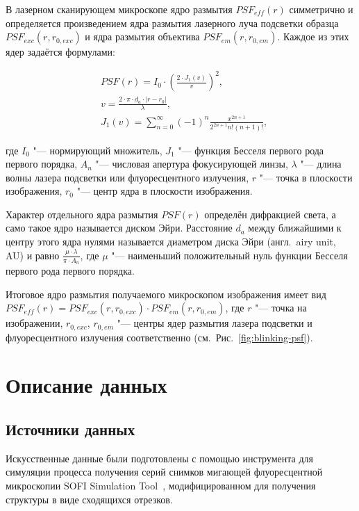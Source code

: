В лазерном сканирующем микроскопе ядро размытия $PSF_{eff}\left(r\right)$ симметрично и определяется произведением ядра размытия лазерного луча подсветки образца $PSF_{exc}\left(r,r_{0,exc}\right)$ и ядра размытия объектива $PSF_{em}\left(r,r_{0,em}\right)$. Каждое из этих ядер задаётся формулами:

\begin{align*}
	&PSF\left(r\right) = I_0 \cdot \left(\frac{2\cdot J_1\left(v\right)}{v}\right)^2, \\
	&v=\frac{2\cdot\pi\cdot d_a\cdot\left|r-r_0\right|}{\lambda}, \\
	&J_1(v)=\sum_{n=0}^{\infty}{\left(-1\right)^n\frac{x^{2n+1}}{2^{2n+1}n!\left(n+1\right)!}},
\end{align*}

\noindent где $I_0$ "--- нормирующий множитель, $J_1$ "--- функция Бесселя первого рода первого порядка, $A_n$ "--- числовая апертура фокусирующей линзы, $\lambda$ "--- длина волны лазера подсветки или флуоресцентного излучения, $r$ "--- точка в плоскости изображения, $r_0$ "--- центр ядра в плоскости изображения.

Характер отдельного ядра размытия $PSF\left(r\right)$ определён дифракцией света, а само такое ядро называется диском Эйри. Расстояние $d_a$ между ближайшими к центру этого ядра нулями называется диаметром диска Эйри (англ.~airy unit, AU) и равно $\frac{\mu\cdot \lambda}{\pi \cdot A_n}$, где $\mu$ "--- наименьший положительный нуль функции Бесселя первого рода первого порядка.

Итоговое ядро размытия получаемого микроскопом изображения имеет вид $PSF_{eff}\left(r\right)=PSF_{exc}\left(r,r_{0,exc}\right)\cdot PSF_{em}\left(r,r_{0,em}\right)$, где $r$ "--- точка на изображении, $r_{0,exc}$, $r_{0,em}$ "--- центры ядер размытия лазера подсветки и флуоресцентного излучения соответственно (см.~Рис.~\ref{fig:blinking-psf}).

\section{Описание данных}

\subsection{Источники данных}

Искусственные данные были подготовлены с помощью инструмента для симуляции процесса получения серий снимков мигающей флуоресцентной микроскопии SOFI Simulation Tool~\cite{10.1371/journal.pone.0161602}, модифицированном для получения структуры в виде сходящихся отрезков.

